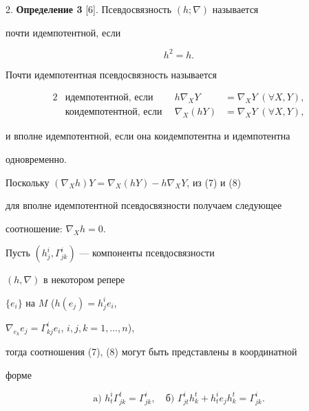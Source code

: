 2. {\bf Определение 3} [6]. Псевдосвязность $(h;\nabla)$ называется


почти идемпотентной, если


\begin{equation}


h^2=h.


\end{equation}





Почти идемпотентная псевдосвязность называется


\begin{alignat}{2}


&\text{идемпотентной, если} &\ \; h\nabla_X Y&=


\nabla_X Y\; (\forall X,Y),\\


&\text{коидемпотентной, если} &\ \; \nabla_X(hY)&=


\nabla_X Y\; (\forall X,Y),


\end{alignat}


и вполне идемпотентной, если она коидемпотентна и идемпотентна


одновременно.


\medskip





Поскольку $(\nabla_X h)Y=\nabla_X(hY)-h\nabla_X Y$, из (7) и (8)


для вполне идемпотентной псевдосвязности получаем следующее


соотношение: $\nabla_X h=0$.


Пусть $(h^i_j,\Gamma^i_{jk})$ --- компоненты псевдосвязности


$(h,\nabla)$ в некотором репере


$\{e_i\}$ на $M$ ($h(e_j)=h^i_j e_i$,


$\nabla_{e_k}e_j=\Gamma^i_{kj}e_i$, $i,j,k=1,\dotsc,n$),


тогда соотношения (7), (8) могут быть представлены в координатной


форме


\begin{equation}


\text{a) } h^i_t\Gamma^t_{jk}=\Gamma^i_{jk},\quad


\text{б) } \Gamma^i_{jt}h^t_k+h^i_t e_j h^t_k=\Gamma^i_{jk}.


\end{equation}


